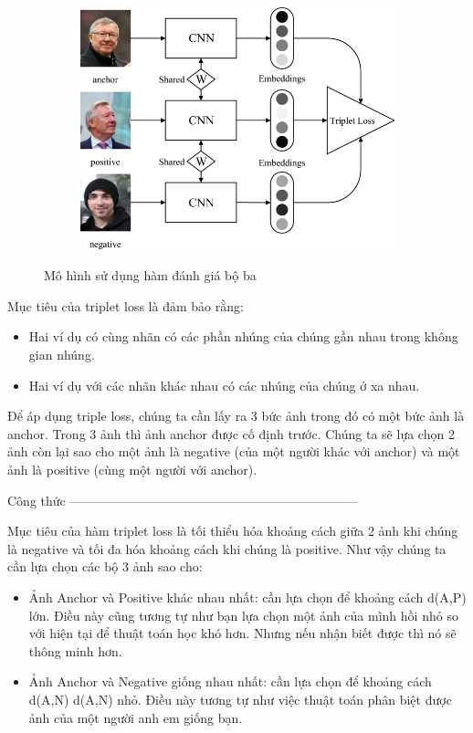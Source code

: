 \begin{figure}
    \begin{subfigure}{1.\textwidth}
        \begin{center}
            \includegraphics[width=1.\linewidth]{Chapters/items/chap2_18.jpg}
        \end{center}
        \label{fig:chap2_18}
    \end{subfigure}
    \caption{Mô hình sử dụng hàm đánh giá bộ ba}
\end{figure}

Mục tiêu của triplet loss là đảm bảo rằng:
\begin{itemize}
    \item Hai ví dụ có cùng nhãn có các phần nhúng của chúng gần nhau trong không gian nhúng.
    \item Hai ví dụ với các nhãn khác nhau có các nhúng của chúng ở xa nhau.
\end{itemize}

Để áp dụng triple loss, chúng ta cần lấy ra 3 bức ảnh trong đó có một bức ảnh là anchor.
Trong 3 ảnh thì ảnh anchor được cố định trước.
Chúng ta sẽ lựa chọn 2 ảnh còn lại sao cho một ảnh là negative
(của một người khác với anchor) và một ảnh là positive (cùng một người với anchor).

Công thức --------------------------------------------------------------------

Mục tiêu của hàm triplet loss là tối thiểu hóa khoảng cách giữa 2 ảnh khi chúng là
negative và tối đa hóa khoảng cách khi chúng là positive.
Như vậy chúng ta cần lựa chọn các bộ 3 ảnh sao cho:
\begin{itemize}
    \item Ảnh Anchor và Positive khác nhau nhất: cần lựa chọn để khoảng cách d(A,P) lớn.
          Điều này cũng tương tự như bạn lựa chọn một ảnh của mình hồi nhỏ so với hiện tại để
          thuật toán học khó hơn. Nhưng nếu nhận biết được thì nó sẽ thông minh hơn.
    \item Ảnh Anchor và Negative giống nhau nhất: cần lựa chọn để khoảng cách d(A,N)
          d(A,N) nhỏ. Điều này tương tự như việc thuật toán phân biệt được ảnh của một người
          anh em giống bạn.
\end{itemize}



